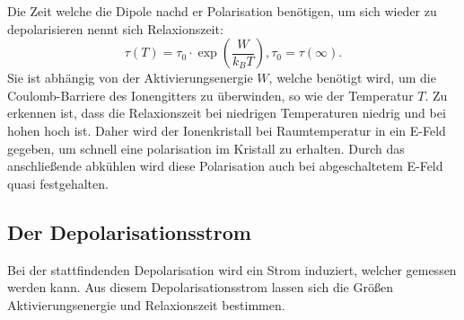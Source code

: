 Die Zeit welche die Dipole nachd er Polarisation benötigen,
um sich wieder zu depolarisieren nennt sich Relaxionszeit:
\begin{equation}
    \tau(T) = \tau_0 \cdot \exp\left(\frac{W}{k_B T}\right) , \tau_0 =\tau(\infty).
\end{equation}
Sie ist abhängig von der Aktivierungsenergie $W$,
welche benötigt wird,
um die Coulomb-Barriere des Ionengitters zu überwinden,
so wie der Temperatur $T$.
Zu erkennen ist,
dass die Relaxionszeit bei niedrigen Temperaturen niedrig und bei hohen hoch ist.
Daher wird der Ionenkristall bei Raumtemperatur in ein E-Feld gegeben,
um schnell eine polarisation im Kristall zu erhalten.
Durch das anschließende abkühlen wird diese Polarisation auch bei abgeschaltetem E-Feld quasi festgehalten. 



\subsection{Der Depolarisationsstrom}
Bei der stattfindenden Depolarisation wird ein Strom induziert,
welcher gemessen werden kann. 
Aus diesem Depolarisationsstrom lassen sich die Größen Aktivierungsenergie und Relaxionszeit bestimmen.


